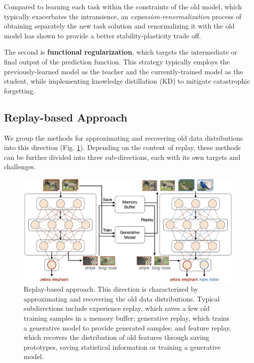 Compared to learning each task within the constraints of the old model, which typically exacerbates the intransience, an \textit{expansion-renormalization} process of obtaining separately the new task solution and renormalizing it with the old model has shown to provide a better stability-plasticity trade off.

The second is \textbf{functional regularization}, which targets the intermediate or final output of the prediction function. This strategy typically employs the previously-learned model as the teacher and the currently-trained model as the student, while implementing knowledge distillation (KD) to mitigate catastrophic forgetting.

\subsection{Replay-based Approach}
We group the methods for approximating and recovering old data distributions into this direction (Fig. \ref{cl_3}). Depending on the content of replay, these methods can be further divided into three sub-directions, each with its own targets and challenges. 

\begin{figure}[H]
	\centering
	\includegraphics[width=0.7\linewidth]{imgs/continual_learning/cl_3.png}
	\caption{Replay-based approach. This direction is characterized by approximating and recovering the old data distributions. Typical subdirections include experience replay, which saves a few old training samples in a memory buffer; generative replay, which trains a generative model to provide generated samples; and feature replay, which recovers the distribution of old features through saving prototypes, saving statistical information or training a generative model.}
	\label{cl_3}
\end{figure}

